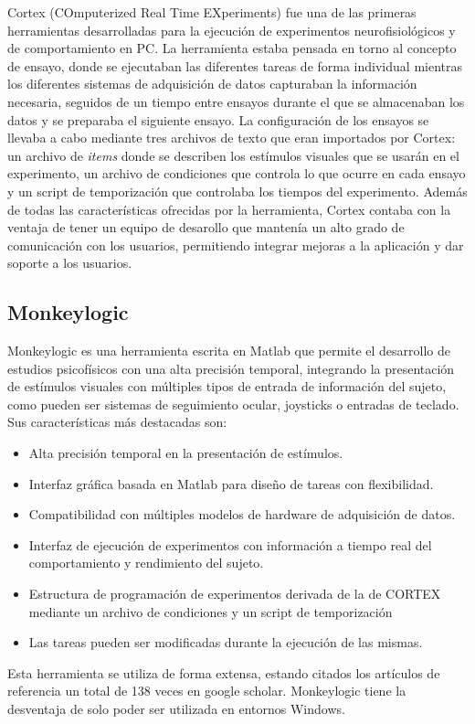 \documentclass[conference]{IEEEtran}
\begin{document}
Cortex (COmputerized Real Time EXperiments)\cite{cortex} fue una de las primeras herramientas desarrolladas para la ejecución de experimentos neurofisiológicos y de comportamiento en PC.
La herramienta estaba pensada en torno al concepto de ensayo, donde se ejecutaban las diferentes tareas de forma individual mientras los diferentes sistemas de adquisición de datos capturaban la información necesaria, seguidos de un tiempo entre ensayos durante el que se almacenaban los datos y se preparaba el siguiente ensayo. 
La configuración de los ensayos se llevaba a cabo mediante tres archivos de texto que eran importados por Cortex: un archivo de \textit{items} donde se describen los estímulos visuales que se usarán en el experimento, un archivo de condiciones que controla lo que ocurre en cada ensayo y un script de temporización que controlaba los tiempos del experimento. Además de todas las características ofrecidas por la herramienta, Cortex contaba con la ventaja de tener un equipo de desarollo que mantenía un alto grado de comunicación con los usuarios, permitiendo integrar mejoras a la aplicación y dar soporte a los usuarios.


\subsection{Monkeylogic}

Monkeylogic\cite{monkeylogic} es una herramienta escrita en  Matlab que permite el desarrollo de estudios psicofísicos con una alta precisión temporal, integrando la presentación de estímulos visuales con múltiples tipos de entrada de información del sujeto, como pueden ser sistemas de seguimiento ocular, joysticks o entradas de teclado.
Sus características más destacadas son:
\begin{itemize}
	\item Alta precisión temporal en la presentación de estímulos. 
	\item Interfaz gráfica basada en Matlab para diseño de tareas con flexibilidad.
	\item Compatibilidad con múltiples modelos de hardware de adquisición de datos.
	\item Interfaz de ejecución de experimentos con información a tiempo real del comportamiento y rendimiento del sujeto.
	\item Estructura de programación de experimentos derivada de la de CORTEX\cite{cortex} mediante un archivo de condiciones y un script de temporización
	\item Las tareas pueden ser modificadas durante la ejecución de las mismas.
\end{itemize}
Esta herramienta se utiliza de forma extensa, estando citados los artículos de referencia un total de 138 veces en google scholar.
Monkeylogic tiene la desventaja de solo poder ser utilizada en entornos Windows.
\end{document}
